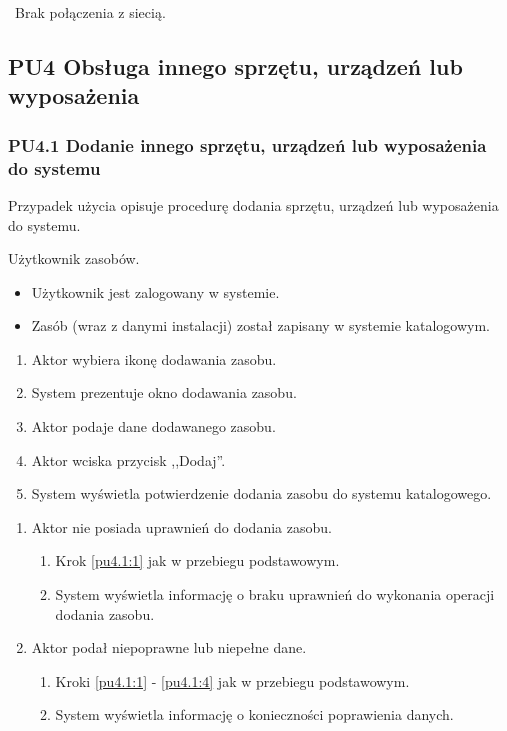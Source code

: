 \
Brak połączenia z siecią.

\subsection{PU4 Obsługa innego sprzętu, urządzeń lub wyposażenia} \label{pu4}
\subsubsection{PU4.1 Dodanie innego sprzętu, urządzeń lub wyposażenia do systemu}

Przypadek użycia opisuje procedurę dodania sprzętu, urządzeń lub wyposażenia do systemu.

Użytkownik zasobów.

\begin{itemize}
\item Użytkownik jest zalogowany w systemie.
\end{itemize}

\begin{itemize}
\item Zasób (wraz z danymi instalacji) został zapisany w systemie katalogowym.
\end{itemize}

\begin{enumerate}
\item \label{pu4.1:1} Aktor wybiera ikonę dodawania zasobu.
\item System prezentuje okno dodawania zasobu.
\item Aktor podaje dane dodawanego zasobu.
\item \label{pu4.1:4} Aktor wciska przycisk ,,Dodaj''.
\item System wyświetla potwierdzenie dodania zasobu do systemu katalogowego.
\end{enumerate}

\begin{enumerate}
\item Aktor nie posiada uprawnień do dodania zasobu.
	\begin{enumerate}[label*=\arabic*.]
		\item Krok \ref{pu4.1:1} jak w przebiegu podstawowym.
		\item System wyświetla informację o braku uprawnień do wykonania operacji dodania zasobu.
	\end{enumerate}
\item Aktor podał niepoprawne lub niepełne dane.
	\begin{enumerate}[label*=\arabic*.]
		\item Kroki \ref{pu4.1:1} - \ref{pu4.1:4} jak w przebiegu podstawowym.
		\item System wyświetla informację o konieczności poprawienia danych.
	\end{enumerate}
\end{enumerate}

